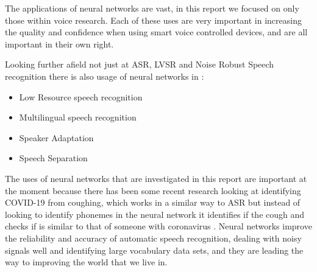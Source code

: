 \documentclass[11pt]{article}
\begin{document}
    The applications of neural networks are vast, in this report we focused on only those within voice research. Each of these uses are very important in increasing the quality and confidence when using smart voice controlled devices, and are all important in their own right.
    
    Looking further afield not just at ASR, LVSR and Noise Robust Speech recognition there is also usage of neural networks in \cite{Nassif2019SpeechReview}:
    \begin{itemize}
        \item Low Resource speech recognition
        \item Multilingual speech recognition
        \item Speaker Adaptation
        \item Speech Separation
    \end{itemize}
    
    The uses of neural networks that are investigated in this report are important at the moment because there has been some recent research looking at identifying COVID-19 from coughing, which works in a similar way to ASR but instead of looking to identify phonemes in the neural network it identifies if the cough and checks if is similar to that of someone with coronavirus \cite{Laguarta2020COVID-19Recordings}.  Neural networks improve the reliability and accuracy of automatic speech recognition, dealing with noisy signals well and identifying large vocabulary data sets, and they are leading the way to improving the world that we live in. 
    
\end{document}
